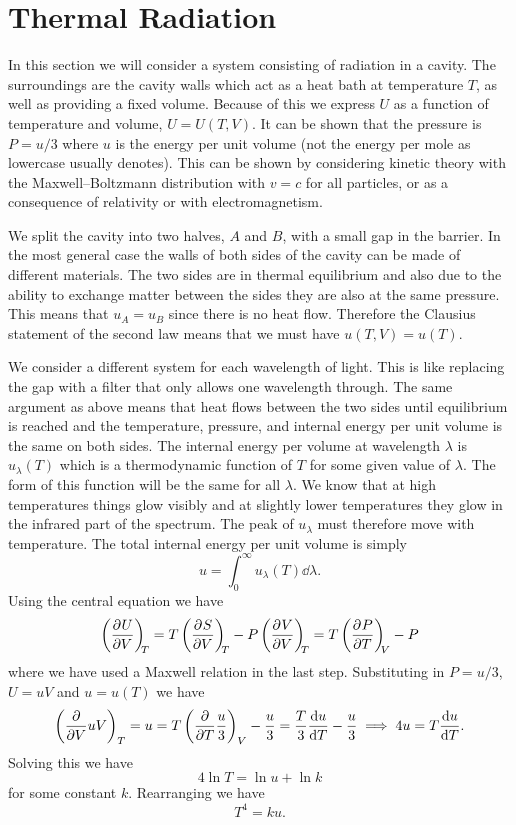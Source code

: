 \documentclass[a4paper]{article}
\begin{document}
    \section{Thermal Radiation}
    In this section we will consider a system consisting of radiation in a cavity.
    The surroundings are the cavity walls which act as a heat bath at temperature \(T\), as well as providing a fixed volume.
    Because of this we express \(U\) as a function of temperature and volume, \(U = U(T, V)\).
    It can be shown that the pressure is \(P = u/3\) where \(u\) is the energy per unit volume (not the energy per mole as lowercase usually denotes).
    This can be shown by considering kinetic theory with the Maxwell--Boltzmann distribution with \(v = c\) for all particles, or as a consequence of relativity or with electromagnetism.
    
    We split the cavity into two halves, \(A\) and \(B\), with a small gap in the barrier.
    In the most general case the walls of both sides of the cavity can be made of different materials.
    The two sides are in thermal equilibrium and also due to the ability to exchange matter between the sides they are also at the same pressure.
    This means that \(u_A = u_B\) since there is no heat flow.
    Therefore the Clausius statement of the second law means that we must have \(u(T, V) = u(T)\).
    
    We consider a different system for each wavelength of light.
    This is like replacing the gap with a filter that only allows one wavelength through.
    The same argument as above means that heat flows between the two sides until equilibrium is reached and the temperature, pressure, and internal energy per unit volume is the same on both sides.
    The internal energy per volume at wavelength \(\lambda\) is \(u_\lambda(T)\) which is a thermodynamic function of \(T\) for some given value of \(\lambda\).
    The form of this function will be the same for all \(\lambda\).
    We know that at high temperatures things glow visibly and at slightly lower temperatures they glow in the infrared part of the spectrum.
    The peak of \(u_\lambda\) must therefore move with temperature.
    The total internal energy per unit volume is simply
    \[u = \int_{0}^{\infty} u_\lambda(T)\dd{\lambda}.\]
    Using the central equation we have
    \[\pdvconst{U}{V}{T} = T\pdvconst{S}{V}{T} - P\pdvconst{V}{V}{T} = T\pdvconst{P}{T}{V} - P\]
    where we have used a Maxwell relation in the last step.
    Substituting in \(P = u/3\), \(U = uV\) and \(u = u(T)\) we have
    \[\left(\pdv{V}uV\right)_T = u = T\left(\pdv{T}\frac{u}{3}\right)_V - \frac{u}{3} = \frac{T}{3}\dv{u}{T} - \frac{u}{3} \implies 4u = T\dv{u}{T}.\]
    Solving this we have
    \[4\ln T = \ln u + \ln k\]
    for some constant \(k\).
    Rearranging we have
    \[T^4 = ku.\]
\end{document}
